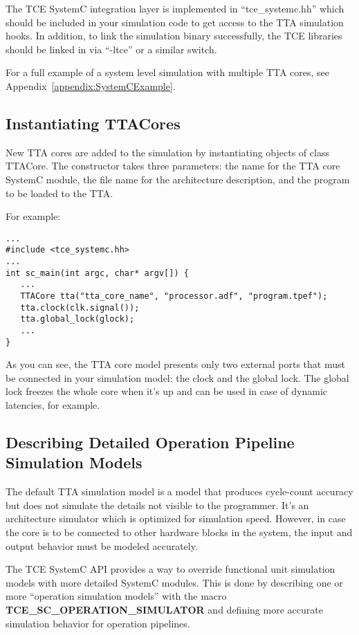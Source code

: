 \documentclass[twoside]{tceusermanual}
\begin{document}
The TCE SystemC integration layer is implemented in ``tce\_systemc.hh'' which 
should be included in your simulation code to get access to the TTA
simulation hooks. In addition, to link the simulation binary successfully,
the TCE libraries should be linked in via ``-ltce'' or a similar switch. 

For a full example of a system level simulation with multiple TTA cores, 
see Appendix~\ref{appendix:SystemCExample}.

\subsection{Instantiating TTACores}

New TTA cores are added to the simulation by instantiating objects of
class TTACore. The constructor takes three parameters: the name for
the TTA core SystemC module, the file name for the architecture description,
and the program to be loaded to the TTA.

For example:

\begin{verbatim}
...
#include <tce_systemc.hh>
...
int sc_main(int argc, char* argv[]) {
   ...
   TTACore tta("tta_core_name", "processor.adf", "program.tpef");
   tta.clock(clk.signal());
   tta.global_lock(glock);
   ...
}
\end{verbatim}

As you can see, the TTA core model presents only two external ports that
must be connected in your simulation model: the clock and the
global lock. The global lock freezes the whole core when
it's up and can be used in case of dynamic latencies, for example.
 
\subsection{Describing Detailed Operation Pipeline Simulation Models}

The default TTA simulation model is a model that produces cycle-count
accuracy but does not simulate the details not visible to the programmer.
It's an architecture simulator which is optimized for simulation speed. 
However, in case the core is to be connected to other hardware blocks in the
system, the input and output behavior must be modeled accurately. 

The TCE SystemC API provides a way to override functional unit simulation
models with more detailed SystemC modules. This is done by describing
one or more ``operation simulation models'' with the macro
\textbf{TCE\_SC\_OPERATION\_SIMULATOR} and defining more accurate
simulation behavior for operation pipelines.
\end{document}
